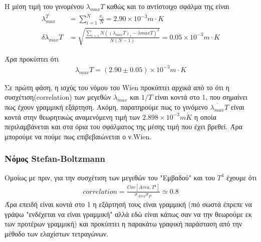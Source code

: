 \documentclass[a4paper]{article}
\begin{document}
Η μέση τιμή του γινομένου $\lambda_{max} T$ καθώς και το αντίστοιχο σφάλμα της είναι 
\begin{align*}
\overline{\lambda_{max}^T}      & =  \sum_{i=1}^{N} \frac{x_i}{N} = 2.90\times 10^{-3} m\cdot K   \\ 
\delta\lambda_{max} T &= \sqrt{\frac{\sum_{i=1}{N} ((\lambda_{max}T)_i -\overline{\lambda{max}T})^2   }{N(N-1)}}=0.05 \times10^{-3}m\cdot K 
\end{align*}

Άρα προκύπτει ότι 
\begin{align*}
\lambda_{max}T = (2.90\pm0.05)\times10^{-3} m\cdot K 
\end{align*}

Σε πρώτη φάση, η ισχύς του νόμου του Wien προκύπτει αρχικά από το ότι η συσχέτιση(correlation) των μεγεθών $\lambda_{max}$ και $1/T$ είναι κοντά στο 1, που σημαίνει πως έχουν γραμμική εξάρτηση. Ακόμη, παρατηρούμε πως το γινόμενο $\overline{\lambda_{max}} T$ είναι 
κοντά στην θεωρητικώς αναμενόμενη τιμή των $2.898\times10^{-3}m\dot K$ η οποία περιλαμβάνεται και στα όρια του σφάλματος της μέσης τιμή που έχει βρεθεί. Άρα μπορούμε να πούμε πως επιβεβαιώνεται ο ν.Wien.

\subsubsection*{Νόμος Stefan-Boltzmann}
Ομοίως με πριν, για την συσχέτιση των μεγεθών του "Εμβαδού" και του $T^4$ έχουμε ότι
\begin{align*}
correlation =\frac{ Cov[Area,T^4]}{\sigma_{Area}\sigma_{T^4}} \simeq 0.8
\end{align*}
Άρα επειδή είναι κοντά στο 1 η εξάρτησή τους είναι γραμμική (πιό σωστά έπρεπε να γράψω "ενδέχεται να είναι γραμμική" αλλά εδώ είναι κάπως σαν να την θεωρούμε εκ των προτέρων γραμμική) και προκύπτει η παρακάτω γραφική παράσταση από την μέθοδο των ελαχίστων τετραγώνων. 
\end{document}
